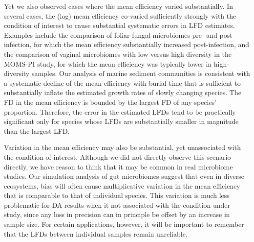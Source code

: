 \documentclass[
]{article}
\begin{document}
Yet we also observed cases where the mean efficiency varied substantially.
In several cases, the (log) mean efficiency co-varied sufficiently strongly with the condition of interest to cause substantial systematic errors in LFD estimates.
Examples include the comparison of foliar fungal microbiomes pre- and post-infection, for which the mean efficiency substantially increased post-infection, and the comparison of vaginal microbiomes with low versus high diversity in the MOMS-PI study, for which the mean efficiency was typically lower in high-diversity samples.
Our analysis of marine sediment communities is consistent with a systematic decline of the mean efficiency with burial time that is sufficient to substantially inflate the estimated growth rates of slowly changing species.
The FD in the mean efficiency is bounded by the largest FD of any species' proportion.
Therefore, the error in the estimated LFDs tend to be practically significant only for species whose LFDs are substantially smaller in magnitude than the largest LFD.

Variation in the mean efficiency may also be substantial, yet unassociated with the condition of interest.
Although we did not directly observe this scenario directly, we have reason to think that it may be common in real microbiome studies.
Our simulation analysis of gut microbiomes suggest that even in diverse ecosystems, bias will often cause multiplicative variation in the mean efficiency that is comparable to that of individual species.
This variation is much less problematic for DA results when it not associated with the condition under study, since any loss in precision can in principle be offset by an increase in sample size.
For certain applications, however, it will be important to remember that the LFDs between individual samples remain unreliable.
\end{document}
